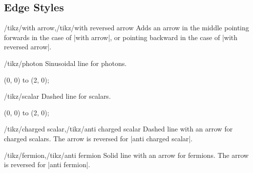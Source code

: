 \documentclass[a4paper,final]{ltxdoc}
\begin{document}
\subsection{Edge Styles}
\label{subsec:edge_styles}

\begin{keylist}{/tikz/with arrow,/tikz/with reversed arrow}
  Adds an arrow in the middle pointing forwards in the case of |with arrow|, or
  pointing backward in the case of |with reversed arrow|.

\begin{codeexample}[]
 \end{codeexample}
\end{keylist}

\begin{key}{/tikz/photon}
  Sinusoidal line for photons.

\begin{codeexample}[]
\tikz \draw[photon] (0, 0) to (2, 0);
\end{codeexample}
\end{key}

\begin{key}{/tikz/scalar}
  Dashed line for scalars.

\begin{codeexample}[]
\tikz \draw[scalar] (0, 0) to (2, 0);
\end{codeexample}
\end{key}

\begin{keylist}{/tikz/charged scalar,/tikz/anti charged scalar}
  Dashed line with an arrow for charged scalars.  The arrow is reversed for 
  |anti charged scalar|.

\begin{codeexample}[]
 \end{codeexample}
\end{keylist}

\begin{keylist}{/tikz/fermion,/tikz/anti fermion}
  Solid line with an arrow for fermions.  The arrow is reversed for 
  |anti fermion|.

\begin{codeexample}[]
 \end{codeexample}
\end{keylist}
\end{document}
